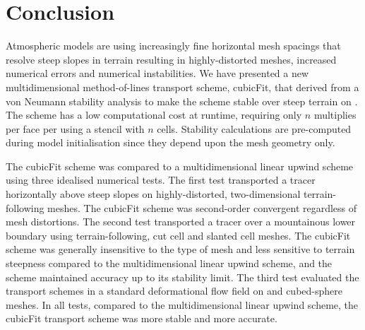 \section{Conclusion}
\label{sec:conclusion}

Atmospheric models are using increasingly fine horizontal mesh spacings that resolve steep slopes in terrain resulting in highly-distorted meshes, increased numerical errors and numerical instabilities.
We have presented a new multidimensional method-of-lines transport scheme, cubicFit, that  derived from a von Neumann stability analysis to make the scheme stable over steep terrain on .
The scheme has a low computational cost at runtime, requiring only $n$ multiplies per face per  using a stencil with $n$ cells.  Stability  calculations are pre-computed during model initialisation since they depend upon the mesh geometry only.

The cubicFit scheme was compared to a multidimensional linear upwind scheme using three idealised numerical tests.
The first test transported a tracer horizontally above steep slopes on highly-distorted, two-dimensional terrain-following meshes.  The cubicFit scheme was second-order convergent regardless of mesh distortions.
The second test transported a tracer over a mountainous lower boundary using terrain-following, cut cell and slanted cell meshes.
The cubicFit scheme was generally insensitive to the type of mesh and less sensitive to terrain steepness compared to the multidimensional linear upwind scheme, and the scheme maintained accuracy up to its stability limit.
The third test evaluated the transport schemes in a standard deformational flow field on  and cubed-sphere meshes.
In all tests, compared to the multidimensional linear upwind scheme, the cubicFit transport scheme was more stable and more accurate.

